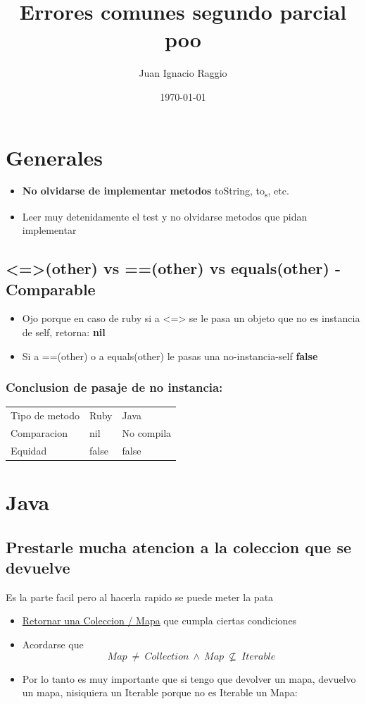 \documentclass[11pt]{article}
\author{Juan Ignacio Raggio}
\date{\today}
\title{Errores comunes segundo parcial poo}
\begin{document}
\maketitle
\tableofcontents

\section{Generales}
\label{sec:org76c486c}
\begin{itemize}
  \item \textbf{No olvidarse de implementar metodos}
    toString, to\textsubscript{s}, etc.
  \item Leer muy detenidamente el test y no olvidarse metodos que pidan implementar
\end{itemize}
\subsection{<=>(other) vs ==(other) vs equals(other) - Comparable}
\label{sec:org30518ee}
\begin{itemize}
  \item Ojo porque en caso de ruby si a <=> se le pasa un objeto que no es instancia de self, retorna:
    \textbf{nil}

  \item Si a ==(other) o a equals(other) le pasas una no-instancia-self
    \textbf{false}
\end{itemize}
\subsubsection{Conclusion de pasaje de no instancia:}
\label{sec:orge7a800b}
\begin{center}
  \begin{tabular}{lll}
    Tipo de metodo & Ruby & Java\\
    Comparacion & nil & No compila\\
    Equidad & false & false\\
  \end{tabular}
\end{center}
\section{Java}
\label{sec:org818f731}
\subsection{Prestarle mucha atencion a la coleccion que se devuelve}
\label{sec:org9fc9d4b}
Es la parte facil pero al hacerla rapido se puede meter la pata
\begin{itemize}
  \item \uline{Retornar una Coleccion / Mapa} que cumpla ciertas condiciones
  \item Acordarse que \[Map\ \neq\ Collection\ \land\ Map\ \nsubseteq\ Iterable\]
  \item Por lo tanto es muy importante que si tengo que devolver un mapa, devuelvo un mapa, nisiquiera un Iterable porque no es Iterable un Mapa:
\end{itemize}
\end{document}
